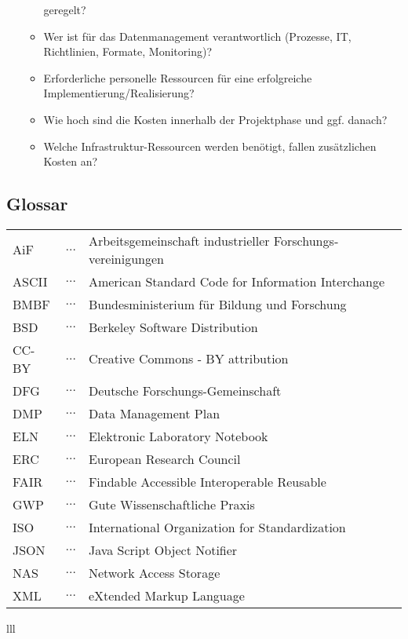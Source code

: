 \begin{enumerate}[start=0, label=\textbf{\arabic*})]
\begin{itemize}
                geregelt?
          \item Wer ist für das Datenmanagement verantwortlich (Prozesse, IT,
                Richtlinien, Formate, Monitoring)?
          \item Erforderliche personelle Ressourcen für eine erfolgreiche
                Implementierung/Realisierung?
          \item Wie hoch sind die Kosten innerhalb der Projektphase und ggf.
                danach?
          \item Welche Infrastruktur-Ressourcen werden benötigt, fallen
                zusätzlichen Kosten an?
        \end{itemize}
\end{enumerate}





\subsection{Glossar}

\begin{table}[h]
\begin{tabular}{lll}
AiF   & $\ldots$  & Arbeits­gemeinschaft industrieller Forschungs­vereinigungen \\
ASCII & $\ldots$  & American Standard Code for Information Interchange \\
BMBF  & $\ldots$  & Bundesministerium für Bildung und Forschung \\
BSD   & $\ldots$  & Berkeley Software Distribution \\
CC-BY & $\ldots$  & Creative Commons - BY attribution \\
DFG   & $\ldots$  & Deutsche Forschungs-Gemeinschaft \\
DMP   & $\ldots$  & Data Management Plan \\
ELN   & $\ldots$  & Elektronic Laboratory Notebook \\
ERC   & $\ldots$  & European Research Council \\
FAIR  & $\ldots$  & Findable Accessible Interoperable Reusable \\
GWP   & $\ldots$  & Gute Wissenschaftliche Praxis \\
ISO   & $\ldots$  & International Organization for Standardization  \\
JSON  & $\ldots$  & Java Script Object Notifier \\
NAS   & $\ldots$  & Network Access Storage \\
XML   & $\ldots$  & eXtended Markup Language \\

\end{tabular} {lll}
\end{table}





